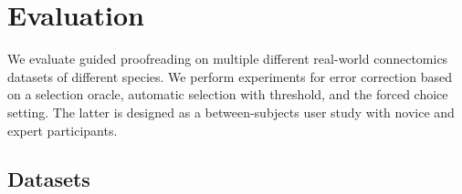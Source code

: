 
\section{Evaluation}
\label{sec:evaluation}

We evaluate guided proofreading on multiple different real-world connectomics datasets of different species. We perform experiments for error correction based on a selection oracle, automatic selection with threshold, and the forced choice setting. The latter is designed as a between-subjects user study with novice and expert participants.

\subsection{Datasets}

